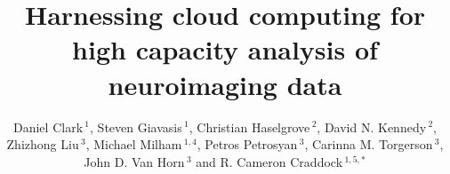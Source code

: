 \documentclass{frontiersSCNS} %
\def\firstAuthorLast{Clark {et~al.}} %
\def\Authors{Daniel Clark\,$^{1}$, Steven Giavasis\,$^{1}$, Christian Haselgrove\,$^{2}$, David N. Kennedy\,$^{2}$, Zhizhong Liu\,$^{3}$, Michael Milham\,$^{1,4}$, Petros Petrosyan\,$^{3}$, Carinna M. Torgerson\,$^{3}$, John D. Van Horn\,$^{3}$ and R. Cameron Craddock\,$^{1,5,*}$}
\begin{document}
\onecolumn
{}

\title[Harnessing cloud computing]{Harnessing cloud computing for high capacity analysis of neuroimaging data} 

\author[\firstAuthorLast ]{\Authors} %
\address{} %
\correspondance{} %

\extraAuth{}%


\maketitle

\end{document}
